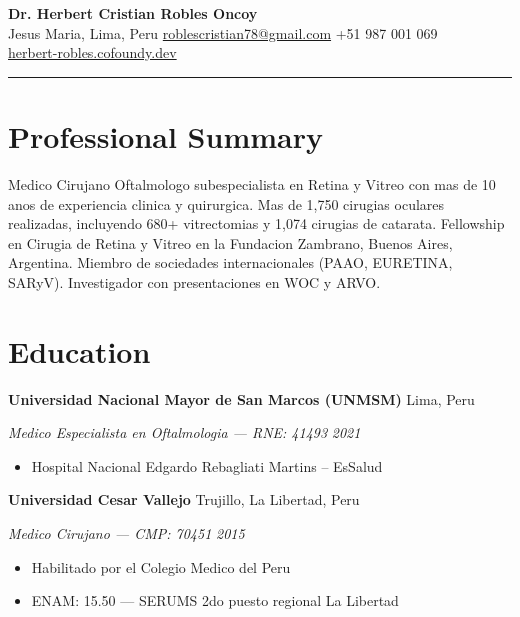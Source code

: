 \documentclass[11pt,letterpaper]{article}
\newcommand{\entry}[4]{%
  \noindent\textbf{#1} \hfill #2 \par\nopagebreak
  \textit{#3} \hfill \textit{#4} \par\nopagebreak
}
\begin{document}
\begin{center}
  {\LARGE\bfseries Dr. Herbert Cristian Robles Oncoy} \\[4pt]
  \enspace Jesus Maria, Lima, Peru
  \quad{}\enspace \href{mailto:roblescristian78@gmail.com}{roblescristian78@gmail.com}
  \quad{}\enspace +51 987 001 069
  \\[2pt]
  \enspace \href{https://herbert-robles.cofoundy.dev}{herbert-robles.cofoundy.dev}
\end{center}

\vspace{-0.4em}
\noindent\rule{\textwidth}{0.8pt}
\vspace{-0.8em}

\section{Professional Summary}

Medico Cirujano Oftalmologo subespecialista en Retina y Vitreo con mas de 10 anos de experiencia clinica y quirurgica. Mas de 1,750 cirugias oculares realizadas, incluyendo 680+ vitrectomias y 1,074 cirugias de catarata. Fellowship en Cirugia de Retina y Vitreo en la Fundacion Zambrano, Buenos Aires, Argentina. Miembro de sociedades internacionales (PAAO, EURETINA, SARyV). Investigador con presentaciones en WOC y ARVO.

\section{Education}

\entry{Universidad Nacional Mayor de San Marcos (UNMSM)}{Lima, Peru}{Medico Especialista en Oftalmologia --- RNE: 41493}{2021}
\begin{itemize}
  \item Hospital Nacional Edgardo Rebagliati Martins -- EsSalud
\end{itemize}
\vspace{0.3em}

\entry{Universidad Cesar Vallejo}{Trujillo, La Libertad, Peru}{Medico Cirujano --- CMP: 70451}{2015}
\begin{itemize}
  \item Habilitado por el Colegio Medico del Peru
  \item ENAM: 15.50 --- SERUMS 2do puesto regional La Libertad
\end{itemize}
\vspace{0.3em}
\end{document}
